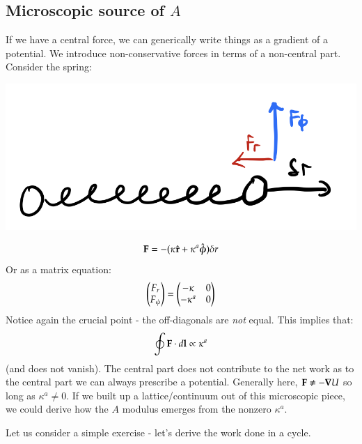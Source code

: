 \subsection{Microscopic source of $A$}

If we have a central force, we can generically write things as a gradient of a potential. We introduce non-conservative forces in terms of a non-central part. Consider the spring:

\begin{center}
    \includegraphics[scale=0.35]{Lectures/Images/lec3-noncentralspring.png}
\end{center}

\begin{equation}
    \mathbf{F} = -(\kappa\hat{\mathbf{r}} + \kappa^a\hat{\mbox{\boldmath$ \phi $}})\delta r
\end{equation}
Or as a matrix equation:
\begin{equation}
    \begin{pmatrix}F_r \\ F_\phi\end{pmatrix} = \begin{pmatrix}-\kappa & 0 \\ -\kappa^a & 0\end{pmatrix}
\end{equation}
Notice again the crucial point - the off-diagonals are \emph{not} equal. This implies that:
\begin{equation}
    \oint \mathbf{F} \cdot d\mathbf{l} \propto \kappa^a
\end{equation}
(and does not vanish). The central part does not contribute to the net work as to the central part we can always prescribe a potential. Generally here, $\v{F} \neq -\nabla U$ so long as $\kappa^a \neq 0$. If we built up a lattice/continuum out of this microscopic piece, we could derive how the $A$ modulus emerges from the nonzero $\kappa^a$.

Let us consider a simple exercise - let's derive the work done in a cycle.

